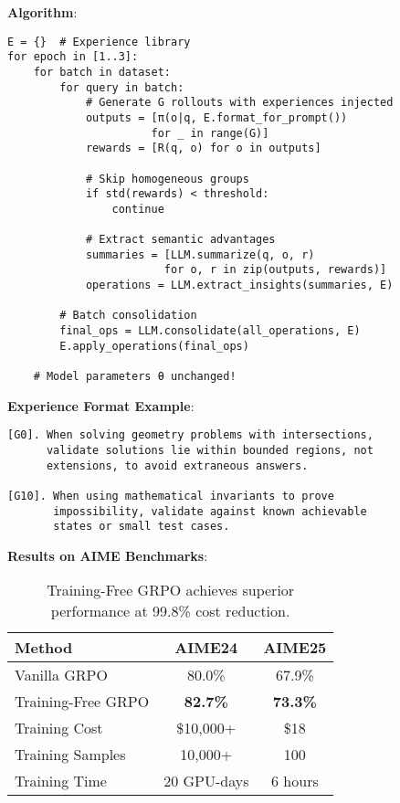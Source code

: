 \documentclass[11pt,letterpaper]{article}
\begin{document}
\textbf{Algorithm}:
\begin{verbatim}
E = {}  # Experience library
for epoch in [1..3]:
    for batch in dataset:
        for query in batch:
            # Generate G rollouts with experiences injected
            outputs = [π(o|q, E.format_for_prompt())
                      for _ in range(G)]
            rewards = [R(q, o) for o in outputs]

            # Skip homogeneous groups
            if std(rewards) < threshold:
                continue

            # Extract semantic advantages
            summaries = [LLM.summarize(q, o, r)
                        for o, r in zip(outputs, rewards)]
            operations = LLM.extract_insights(summaries, E)

        # Batch consolidation
        final_ops = LLM.consolidate(all_operations, E)
        E.apply_operations(final_ops)

    # Model parameters θ unchanged!
\end{verbatim}

\textbf{Experience Format Example}:
\begin{verbatim}
[G0]. When solving geometry problems with intersections,
      validate solutions lie within bounded regions, not
      extensions, to avoid extraneous answers.

[G10]. When using mathematical invariants to prove
       impossibility, validate against known achievable
       states or small test cases.
\end{verbatim}

\textbf{Results on AIME Benchmarks}:
\begin{table}[h]
\centering
\begin{tabular}{lcc}
\toprule
Method & AIME24 & AIME25 \\
\midrule
Vanilla GRPO & 80.0\% & 67.9\% \\
Training-Free GRPO & \textbf{82.7\%} & \textbf{73.3\%} \\
\midrule
Training Cost & \$10,000+ & \$18 \\
Training Samples & 10,000+ & 100 \\
Training Time & 20 GPU-days & 6 hours \\
\bottomrule
\end{tabular}
\caption{Training-Free GRPO achieves superior performance at 99.8\% cost reduction.}
\label{tab:grpo-results}
\end{table}
\end{document}
